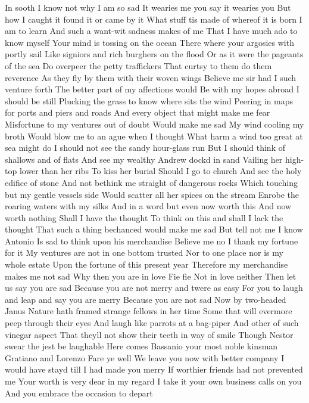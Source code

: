 In sooth I know not why I am so sad
It wearies me you say it wearies you
But how I caught it found it or came by it
What stuff tis made of whereof it is born
I am to learn
And such a want-wit sadness makes of me
That I have much ado to know myself
Your mind is tossing on the ocean
There where your argosies with portly sail
Like signiors and rich burghers on the flood
Or as it were the pageants of the sea
Do overpeer the petty traffickers
That curtsy to them do them reverence
As they fly by them with their woven wings
Believe me sir had I such venture forth
The better part of my affections would
Be with my hopes abroad I should be still
Plucking the grass to know where sits the wind
Peering in maps for ports and piers and roads
And every object that might make me fear
Misfortune to my ventures out of doubt
Would make me sad
My wind cooling my broth
Would blow me to an ague when I thought
What harm a wind too great at sea might do
I should not see the sandy hour-glass run
But I should think of shallows and of flats
And see my wealthy Andrew dockd in sand
Vailing her high-top lower than her ribs
To kiss her burial Should I go to church
And see the holy edifice of stone
And not bethink me straight of dangerous rocks
Which touching but my gentle vessels side
Would scatter all her spices on the stream
Enrobe the roaring waters with my silks
And in a word but even now worth this
And now worth nothing Shall I have the thought
To think on this and shall I lack the thought
That such a thing bechanced would make me sad
But tell not me I know Antonio
Is sad to think upon his merchandise
Believe me no I thank my fortune for it
My ventures are not in one bottom trusted
Nor to one place nor is my whole estate
Upon the fortune of this present year
Therefore my merchandise makes me not sad
Why then you are in love
Fie fie
Not in love neither Then let us say you are sad
Because you are not merry and twere as easy
For you to laugh and leap and say you are merry
Because you are not sad Now by two-headed Janus
Nature hath framed strange fellows in her time
Some that will evermore peep through their eyes
And laugh like parrots at a bag-piper
And other of such vinegar aspect
That theyll not show their teeth in way of smile
Though Nestor swear the jest be laughable
Here comes Bassanio your most noble kinsman
Gratiano and Lorenzo Fare ye well
We leave you now with better company
I would have stayd till I had made you merry
If worthier friends had not prevented me
Your worth is very dear in my regard
I take it your own business calls on you
And you embrace the occasion to depart

